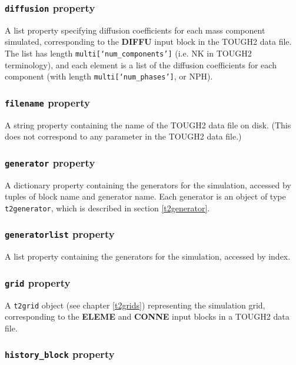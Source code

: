 \subsubsection{\texttt{diffusion} property}

A list property specifying diffusion coefficients for each mass component simulated, corresponding to the \textbf{DIFFU} input block in the TOUGH2 data file.  The list has length \texttt{multi[`num\_components']} (i.e. NK in TOUGH2 terminology), and each element is a list of the diffusion coefficients for each component (with length \texttt{multi[`num\_phases']}, or NPH).

\subsubsection{\texttt{filename} property}

A string property containing the name of the TOUGH2 data file on disk.  (This does not correspond to any parameter in the TOUGH2 data file.)

\subsubsection{\texttt{generator} property}

A dictionary property containing the generators for the simulation, accessed by tuples of block name and generator name.  Each generator is an object of type \texttt{t2generator}, which is described in section \ref{t2generator}.

\subsubsection{\texttt{generatorlist} property}

A list property containing the generators for the simulation, accessed by index.

\subsubsection{\texttt{grid} property}

A \texttt{t2grid} object (see chapter \ref{t2grids}) representing the simulation grid, corresponding to the \textbf{ELEME} and \textbf{CONNE} input blocks in a TOUGH2 data file.

\subsubsection{\texttt{history\_block} property}

